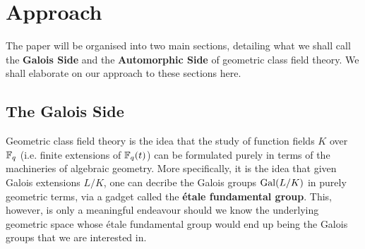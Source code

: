 	\section{Approach}
	    The paper will be organised into two main sections, detailing what we shall call the \textbf{Galois Side} and the \textbf{Automorphic Side} of geometric class field theory. We shall elaborate on our approach to these sections here.

        \subsection{The Galois Side}
            Geometric class field theory is the idea that the study of function fields $K$ over $\mathbb{F}_q$ (i.e. finite extensions of $\mathbb{F}_q(t)$) can be formulated purely in terms of the machineries of algebraic geometry. More specifically, it is the idea that given Galois extensions $L/K$, one can decribe the Galois groups $\mathrm{Gal}(L/K)$ in purely geometric terms, via a gadget called the \textbf{\'etale fundamental group}. This, however, is only a meaningful endeavour should we know the underlying geometric space whose \'etale fundamental group would end up being the Galois groups that we are interested in.
            
